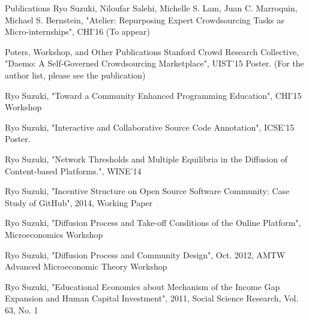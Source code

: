 \documentclass{resume} %
\begin{document}
\begin{rSection}{Publications}
Ryo Suzuki, Niloufar Salehi, Michelle S. Lam,
Juan C. Marroquin, Michael S. Bernstein, "Atelier: Repurposing Expert Crowdsourcing Tasks as Micro-internships", CHI'16 (To appear)
\\
\end{rSection}

\begin{rSection}{Poters, Workshop, and Other Publications}
Stanford Crowd Research Collective, "Daemo: A Self-Governed Crowdsourcing Marketplace", UIST'15 Poster. (For the author list, please see the publication)

Ryo Suzuki, "Toward a Community Enhanced Programming Education", CHI'15 Workshop

Ryo Suzuki, "Interactive and Collaborative Source Code Annotation", ICSE'15 Poster.

Ryo Suzuki, "Network Thresholds and Multiple Equilibria in the Diffusion of Content-based Platforms.", WINE'14

Ryo Suzuki, "Incentive Structure on Open Source Software Community: Case Study of GitHub", 2014, Working Paper

Ryo Suzuki, "Diffusion Process and Take-off Conditions of the Online Platform", Microeconomics Workshop

Ryo Suzuki, "Diffusion Process and Community Design", Oct. 2012, AMTW Advanced Microeconomic Theory Workshop

Ryo Suzuki, "Educational Economics about Mechanism of the Income Gap Expansion and Human Capital Investment", 2011, Social Science Research, Vol. 63, No. 1
\\
\end{rSection}
\end{document}
